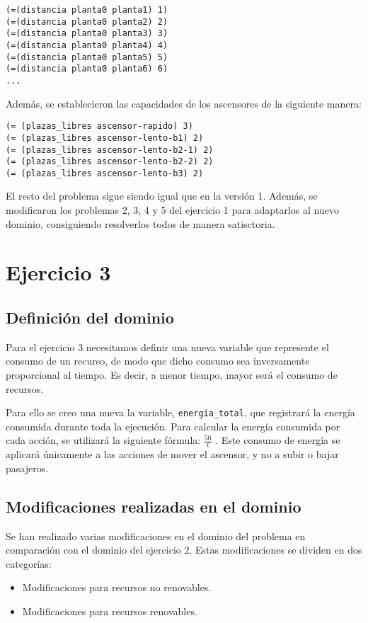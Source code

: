 \documentclass{article}
\begin{document}
\begin{verbatim}
(=(distancia planta0 planta1) 1)
(=(distancia planta0 planta2) 2)
(=(distancia planta0 planta3) 3)
(=(distancia planta0 planta4) 4)
(=(distancia planta0 planta5) 5)
(=(distancia planta0 planta6) 6)
...
\end{verbatim}

Además, se establecieron las capacidades de los ascensores de la siguiente manera:

\begin{verbatim}
(= (plazas_libres ascensor-rapido) 3)
(= (plazas_libres ascensor-lento-b1) 2)
(= (plazas_libres ascensor-lento-b2-1) 2)
(= (plazas_libres ascensor-lento-b2-2) 2)
(= (plazas_libres ascensor-lento-b3) 2)
\end{verbatim}

El resto del problema sigue siendo igual que en la versión 1. Además, se modificaron los problemas 2, 3, 4 y 5 del ejercicio 1 para adaptarlos al nuevo dominio,
consiguiendo resolverlos todos de manera satisctoria.


\section{Ejercicio 3}

\subsection{Definición del dominio}
Para el ejercicio 3 necesitamos definir una nueva variable que represente el consumo de un recurso, 
de modo que dicho consumo sea inversamente proporcional al tiempo. Es decir, a menor tiempo, mayor será el consumo de recursos.

Para ello se creo una nueva la variable, \texttt{energia\_total}, que registrará la energía consumida durante toda la ejecución. 
Para calcular la energía consumida por cada acción, se utilizará la siguiente fórmula: \( \frac{50}{t} \)
 . Este consumo de energía se aplicará únicamente a las acciones de mover el ascensor, y no a subir o bajar pasajeros.

\subsection{Modificaciones realizadas en el dominio}
Se han realizado varias modificaciones en el dominio del problema en comparación con el dominio del ejercicio 2. Estas modificaciones se dividen en dos categorías:
\begin{itemize}
\item Modificaciones para recursos no renovables.
\item Modificaciones para recursos renovables.
\end{itemize}
\end{document}
